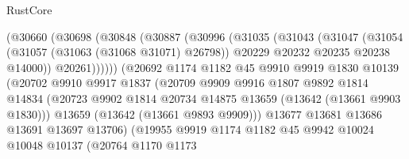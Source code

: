 \begin{lexlean}{RustCore}
\begin{coremodule}
                          (@30660
                            (@30698
                              (@30848
                                (@30887
                                  (@30996
                                    (@31035
                                      (@31043
                                        (@31047
                                          (@31054
                                            (@31057 (@31063 (@31068 @31071) @26798))
                                            @20229
                                            @20232
                                            @20235
                                            @20238
                                            @14000))
                                        @20261))))))
                            (@20692
                              @1174
                              @1182
                              @45
                              @9910
                              @9919
                              @1830
                              @10139
                              (@20702
                                @9910
                                @9917
                                @1837
                                (@20709
                                  @9909
                                  @9916
                                  @1807
                                  @9892
                                  @1814
                                  @14834
                                  (@20723
                                    @9902
                                    @1814
                                    @20734
                                    @14875
                                    @13659
                                    (@13642 (@13661 @9903 @1830)))
                                  @13659
                                  (@13642 (@13661 @9893 @9909)))
                                @13677
                                @13681
                                @13686
                                @13691
                                @13697
                                @13706)
                              (@19955
                                @9919
                                @1174
                                @1182
                                @45
                                @9942
                                @10024
                                @10048
                                @10137
                                (@20764
                                  @1170
                                  @1173

\end{coremodule}
\end{lexlean}
